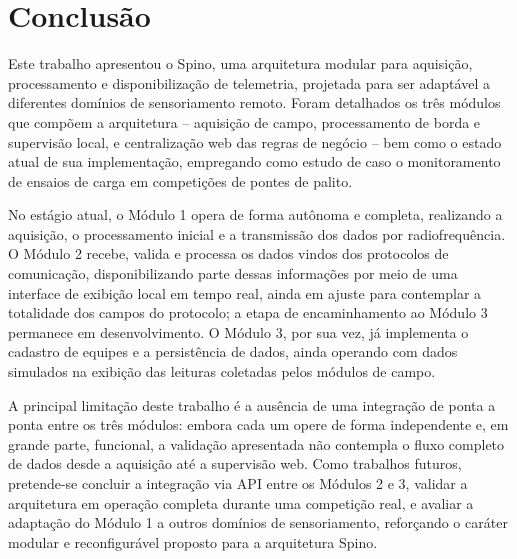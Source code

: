 \documentclass[conference]{IEEEtran}
\begin{document}
\section{Conclusão}
Este trabalho apresentou o Spino, uma arquitetura modular para aquisição, processamento e disponibilização de telemetria, projetada para ser adaptável a diferentes domínios de sensoriamento remoto. Foram detalhados os três módulos que compõem a arquitetura -- aquisição de campo, processamento de borda e supervisão local, e centralização web das regras de negócio -- bem como o estado atual de sua implementação, empregando como estudo de caso o monitoramento de ensaios de carga em competições de pontes de palito.

No estágio atual, o Módulo 1 opera de forma autônoma e completa, realizando a aquisição, o processamento inicial e a transmissão dos dados por radiofrequência. O Módulo 2 recebe, valida e processa os dados vindos dos protocolos de comunicação, disponibilizando parte dessas informações por meio de uma interface de exibição local em tempo real, ainda em ajuste para contemplar a totalidade dos campos do protocolo; a etapa de encaminhamento ao Módulo 3 permanece em desenvolvimento. O Módulo 3, por sua vez, já implementa o cadastro de equipes e a persistência de dados, ainda operando com dados simulados na exibição das leituras coletadas pelos módulos de campo.

A principal limitação deste trabalho é a ausência de uma integração de ponta a ponta entre os três módulos: embora cada um opere de forma independente e, em grande parte, funcional, a validação apresentada não contempla o fluxo completo de dados desde a aquisição até a supervisão web. Como trabalhos futuros, pretende-se concluir a integração via API entre os Módulos 2 e 3, validar a arquitetura em operação completa durante uma competição real, e avaliar a adaptação do Módulo 1 a outros domínios de sensoriamento, reforçando o caráter modular e reconfigurável proposto para a arquitetura Spino.
\end{document}
